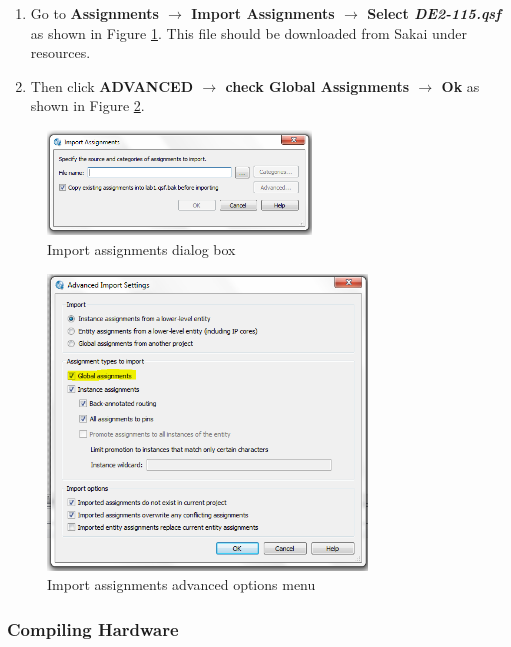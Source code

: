  \begin{enumerate}  
 
	\item Go to {\bf Assignments $\rightarrow$  Import Assignments $\rightarrow$  Select \emph{DE2-115.qsf}} as shown in Figure \ref{fig:importassign}. This file should be downloaded from Sakai under resources. 
	
	\item Then click {\bf ADVANCED $\rightarrow$ check Global Assignments $\rightarrow$ Ok} as shown in Figure \ref{fig:advancedimport}.

\end{enumerate}

\begin{figure}[H]
	\centering
	\includegraphics[width=70mm]{Lab1/figures/importassign.png}
	\caption{Import assignments dialog box}
	\label{fig:importassign}
\end{figure}

\begin{figure}[H]
	\centering
	\includegraphics[width=85mm]{Lab1/figures/advancedimport.png}
	\caption{Import assignments advanced options menu}
	\label{fig:advancedimport}
\end{figure}

\subsubsection{Compiling Hardware}

